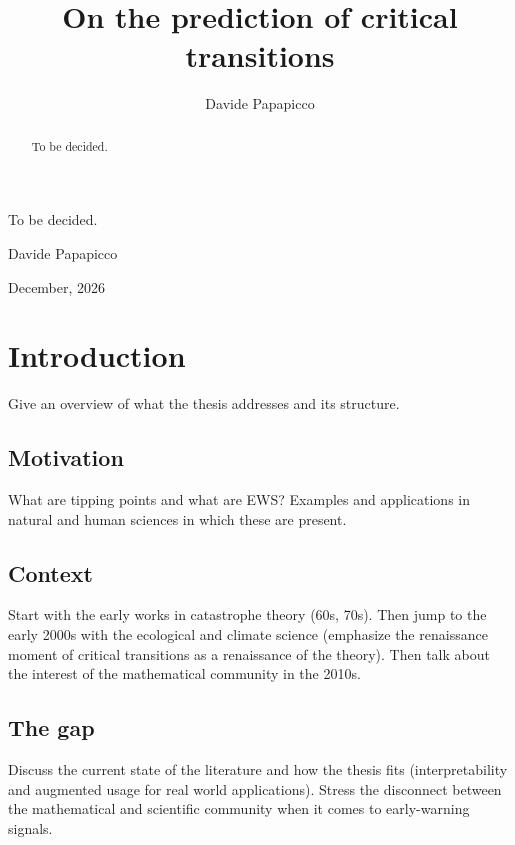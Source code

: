 \documentclass[a4paper,12pt,print]{style}
\title{On the prediction of critical transitions}
\author{Davide Papapicco}
\begin{document}
\maketitle

\frontmatter

\begin{abstract}
\noindent
To be decided.
\end{abstract}

\begin{acknowledgements}
To be decided.

\begin{flushright}
  Davide Papapicco

  December, 2026
\end{flushright}
\end{acknowledgements}

\setcounter{tocdepth}{1}
\tableofcontents

\mainmatter

\chapter{Introduction}\label{sec:intro}
Give an overview of what the thesis addresses and its structure.

\section{Motivation}\label{subsec:motivation}
What are tipping points and what are EWS?
Examples and applications in natural and human sciences in which these are present.

\section{Context}\label{subsec:context}
Start with the early works in catastrophe theory (60s, 70s).
Then jump to the early 2000s with the ecological and climate science (emphasize the renaissance moment of critical transitions as a renaissance of the theory).
Then talk about the interest of the mathematical community in the 2010s.

\section{The gap}\label{subsec:gap}
Discuss the current state of the literature and how the thesis fits (interpretability and augmented usage for real world applications).
Stress the disconnect between the mathematical and scientific community when it comes to early-warning signals.
\end{document}
